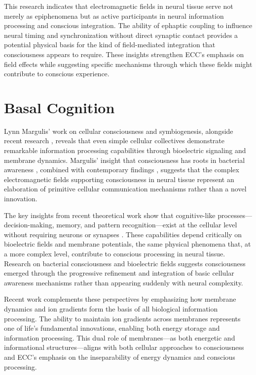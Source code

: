 \begin{refsection}
This research indicates that electromagnetic fields in neural tissue serve not merely as epiphenomena but as active participants in neural information processing and conscious integration. The ability of ephaptic coupling to influence neural timing and synchronization without direct synaptic contact provides a potential physical basis for the kind of field-mediated integration that consciousness appears to require. These insights strengthen ECC's emphasis on field effects while suggesting specific mechanisms through which these fields might contribute to conscious experience.

\section{Basal Cognition}

Lynn Margulis' work on cellular consciousness and symbiogenesis, alongside recent research \cite{Lyon2015}, reveals that even simple cellular collectives demonstrate remarkable information processing capabilities through bioelectric signaling and membrane dynamics. Margulis' insight that consciousness has roots in bacterial awareness \cite{Margulis2001}, combined with contemporary findings \cite{Baluska2016}, suggests that the complex electromagnetic fields supporting consciousness in neural tissue represent an elaboration of primitive cellular communication mechanisms rather than a novel innovation.

The key insights from recent theoretical work show that cognitive-like processes—decision-making, memory, and pattern recognition—exist at the cellular level without requiring neurons or synapses \cite{Shapiro2007}. These capabilities depend critically on bioelectric fields and membrane potentials, the same physical phenomena that, at a more complex level, contribute to conscious processing in neural tissue. Research on bacterial consciousness \cite{vanDuijn2006} and bioelectric fields suggests consciousness emerged through the progressive refinement and integration of basic cellular awareness mechanisms rather than appearing suddenly with neural complexity.

Recent work \cite{Lane2015} complements these perspectives by emphasizing how membrane dynamics and ion gradients form the basis of all biological information processing. The ability to maintain ion gradients across membranes represents one of life's fundamental innovations, enabling both energy storage and information processing. This dual role of membranes—as both energetic and informational structures—aligns with both cellular approaches to consciousness and ECC's emphasis on the inseparability of energy dynamics and conscious processing.


\end{refsection}
